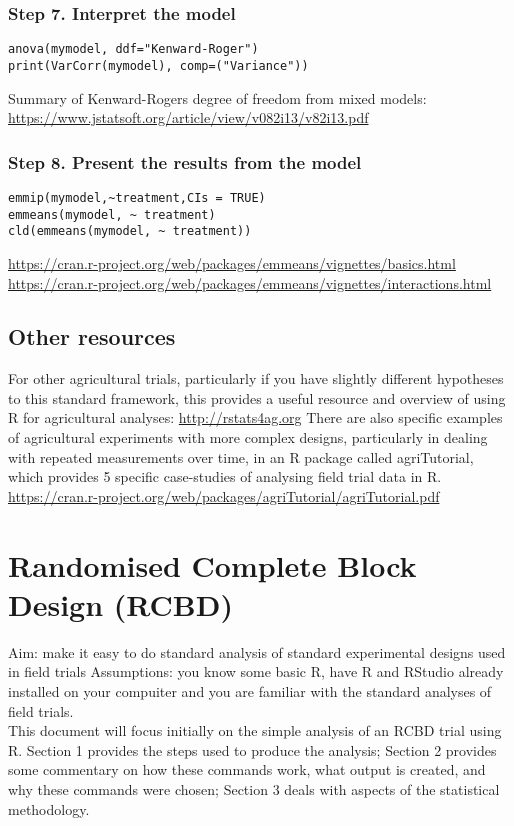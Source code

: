 \documentclass[]{book}
\theoremstyle{definition}
\theoremstyle{definition}
\theoremstyle{definition}
\theoremstyle{remark}
\begin{document}
\subsection{Step 7. Interpret the
model}\label{step-7.-interpret-the-model-1}

\begin{verbatim}
anova(mymodel, ddf="Kenward-Roger")
print(VarCorr(mymodel), comp=("Variance"))
\end{verbatim}

Summary of Kenward-Rogers degree of freedom from mixed models:
\url{https://www.jstatsoft.org/article/view/v082i13/v82i13.pdf}

\subsection{Step 8. Present the results from the
model}\label{step-8.-present-the-results-from-the-model-1}

\begin{verbatim}
emmip(mymodel,~treatment,CIs = TRUE)
emmeans(mymodel, ~ treatment)
cld(emmeans(mymodel, ~ treatment))
\end{verbatim}

\url{https://cran.r-project.org/web/packages/emmeans/vignettes/basics.html}
\url{https://cran.r-project.org/web/packages/emmeans/vignettes/interactions.html}

\section{Other resources}\label{other-resources}

For other agricultural trials, particularly if you have slightly
different hypotheses to this standard framework, this provides a useful
resource and overview of using R for agricultural analyses:
\url{http://rstats4ag.org} There are also specific examples of
agricultural experiments with more complex designs, particularly in
dealing with repeated measurements over time, in an R package called
agriTutorial, which provides 5 specific case-studies of analysing field
trial data in R.
\url{https://cran.r-project.org/web/packages/agriTutorial/agriTutorial.pdf}

\chapter{Randomised Complete Block Design
(RCBD)}\label{randomised-complete-block-design-rcbd}

Aim: make it easy to do standard analysis of standard experimental
designs used in field trials Assumptions: you know some basic R, have R
and RStudio already installed on your compuiter and you are familiar
with the standard analyses of field trials.\\
This document will focus initially on the simple analysis of an RCBD
trial using R. Section 1 provides the steps used to produce the
analysis; Section 2 provides some commentary on how these commands work,
what output is created, and why these commands were chosen; Section 3
deals with aspects of the statistical methodology.
\end{document}
